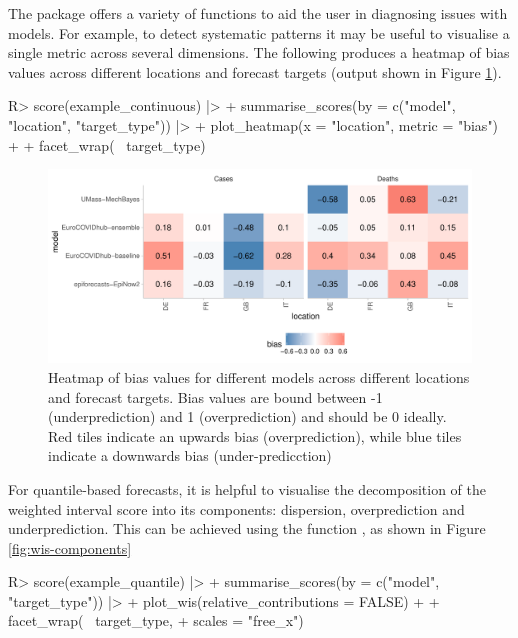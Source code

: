 \documentclass[
]{jss}
\begin{document}
The  package offers a variety of functions to aid the
user in diagnosing issues with models. For example, to detect systematic
patterns it may be useful to visualise a single metric across several
dimensions. The following produces a heatmap of bias values across
different locations and forecast targets (output shown in Figure
\ref{fig:score-heatmap}).

\begin{CodeChunk}
\begin{CodeInput}
R> score(example_continuous) |>
+   summarise_scores(by = c("model", "location", "target_type")) |>
+   plot_heatmap(x = "location", metric = "bias") +
+     facet_wrap(~ target_type)
\end{CodeInput}
\begin{figure}[!h]

{\centering \includegraphics[width=1\linewidth]{manuscript_files/figure-latex/score-heatmap-1}

}

\caption[Heatmap of bias values for different models across different locations and forecast targets]{Heatmap of bias values for different models across different locations and forecast targets. Bias values are bound between -1 (underprediction) and 1 (overprediction) and should be 0 ideally. Red tiles indicate an upwards bias (overprediction), while blue tiles indicate a downwards bias (under-predicction)}\label{fig:score-heatmap}
\end{figure}
\end{CodeChunk}

For quantile-based forecasts, it is helpful to visualise the
decomposition of the weighted interval score into its components:
dispersion, overprediction and underprediction. This can be achieved
using the function , as shown in Figure
\ref{fig:wis-components}

\begin{CodeChunk}
\begin{CodeInput}
R> score(example_quantile) |>
+   summarise_scores(by = c("model", "target_type")) |>
+   plot_wis(relative_contributions = FALSE) +
+   facet_wrap(~ target_type,
+              scales = "free_x")
\end{CodeInput}
\end{CodeChunk}
\end{document}
